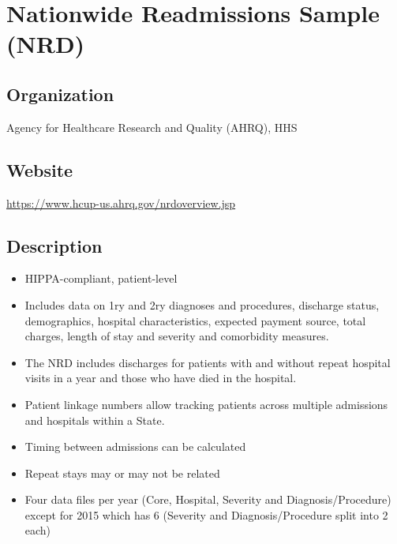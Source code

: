 \documentclass[
]{book}
\providecommand{\tightlist}{%
  \setlength{\itemsep}{0pt}\setlength{\parskip}{0pt}}
\begin{document}
\mainmatter

\hypertarget{nationwide-readmissions-sample-nrd}{%
\chapter{Nationwide Readmissions Sample (NRD)}\label{nationwide-readmissions-sample-nrd}}

\hypertarget{organization-70}{%
\section{Organization}\label{organization-70}}

Agency for Healthcare Research and Quality (AHRQ), HHS

\hypertarget{website-70}{%
\section{Website}\label{website-70}}

\url{https://www.hcup-us.ahrq.gov/nrdoverview.jsp}

\hypertarget{description-70}{%
\section{Description}\label{description-70}}

\begin{itemize}
\tightlist
\item
  HIPPA-compliant, patient-level
\item
  Includes data on 1ry and 2ry diagnoses and procedures, discharge status, demographics, hospital characteristics, expected payment source, total charges, length of stay and severity and comorbidity measures.
\item
  The NRD includes discharges for patients with and without repeat hospital visits in a year and those who have died in the hospital.
\item
  Patient linkage numbers allow tracking patients across multiple admissions and hospitals within a State.
\item
  Timing between admissions can be calculated
\item
  Repeat stays may or may not be related
\item
  Four data files per year (Core, Hospital, Severity and Diagnosis/Procedure) except for 2015 which has 6 (Severity and Diagnosis/Procedure split into 2 each)
\end{itemize}
\end{document}
